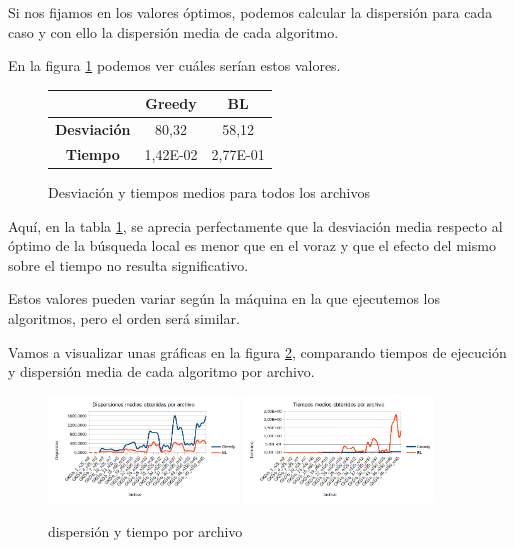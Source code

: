 Si nos fijamos en los valores óptimos, podemos calcular la dispersión para cada caso y con ello la dispersión media de cada algoritmo.

En la figura \ref{fig:dispYTmedios} podemos ver cuáles serían estos valores.

\begin{figure}[H]
    \centering
	\begin{tabular}{|c|c|c|}
	    \hline
	    & \textbf{Greedy} & \textbf{BL}\\
	    \hline
	    \textbf{Desviación} & 80,32 & 58,12\\
	    \hline
	    \textbf{Tiempo} & 1,42E-02 & 2,77E-01\\
	    \hline
	\end{tabular}
	\caption{Desviación y tiempos medios para todos los archivos}
	\label{fig:dispYTmedios}
\end{figure}

Aquí, en la tabla \ref{fig:dispYTmedios}, se aprecia perfectamente que la desviación media respecto al óptimo de la búsqueda local es menor que en el voraz y que el efecto del mismo sobre el tiempo no resulta significativo.

Estos valores pueden variar según la máquina en la que ejecutemos los algoritmos, pero el orden será similar.

Vamos a visualizar unas gráficas en la figura \ref{fig:dispYTmedios_graf}, comparando tiempos de ejecución y dispersión media de cada algoritmo por archivo.

\begin{figure}[H]
    \centering
	\includegraphics[width=0.45\textwidth]{data/mean_disps.png}
	\includegraphics[width=0.45\textwidth]{data/mean_time.png}
	\caption{dispersión y tiempo por archivo}
	\label{fig:dispYTmedios_graf}
\end{figure}

